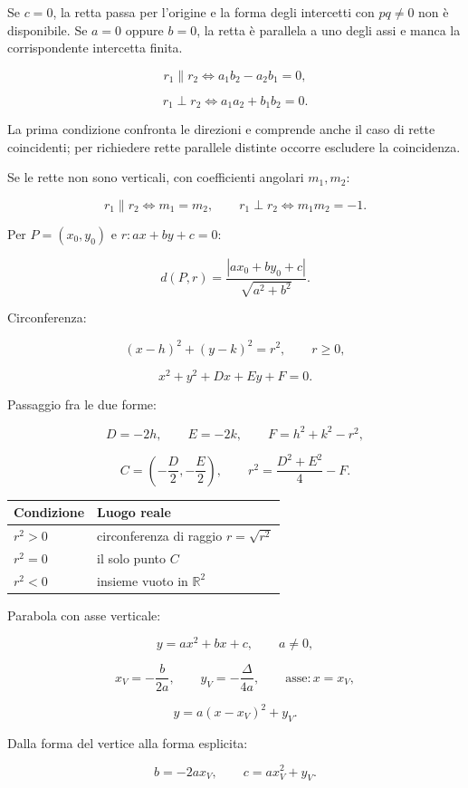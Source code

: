 Se \(c=0\), la retta passa per l'origine e la forma degli intercetti con \(pq\ne0\) non è disponibile. Se \(a=0\) oppure \(b=0\), la retta è parallela a uno degli assi e manca la corrispondente intercetta finita.

\[
r_1\parallel r_2
\Longleftrightarrow
a_1b_2-a_2b_1=0,
\]

\[
r_1\perp r_2
\Longleftrightarrow
a_1a_2+b_1b_2=0.
\]

La prima condizione confronta le direzioni e comprende anche il caso di rette coincidenti; per richiedere rette parallele distinte occorre escludere la coincidenza.

Se le rette non sono verticali, con coefficienti angolari \(m_1,m_2\):

\[
r_1\parallel r_2\Longleftrightarrow m_1=m_2,
\qquad
r_1\perp r_2\Longleftrightarrow m_1m_2=-1.
\]

Per \(P=(x_0,y_0)\) e \(r:ax+by+c=0\):

\[
d(P,r)=\frac{|ax_0+by_0+c|}{\sqrt{a^2+b^2}}.
\]

Circonferenza:

\[
(x-h)^2+(y-k)^2=r^2,
\qquad r\ge0,
\]

\[
x^2+y^2+Dx+Ey+F=0.
\]

Passaggio fra le due forme:

\[
D=-2h,
\qquad
E=-2k,
\qquad
F=h^2+k^2-r^2,
\]

\[
C=\left(-\frac D2,-\frac E2\right),
\qquad
r^2=\frac{D^2+E^2}{4}-F.
\]

\begin{longtable}[]{@{}ll@{}}
\toprule\noalign{}
Condizione & Luogo reale \\
\midrule\noalign{}
\endhead
\bottomrule\noalign{}
\endlastfoot
\(r^2>0\) & circonferenza di raggio \(r=\sqrt{r^2}\) \\
\(r^2=0\) & il solo punto \(C\) \\
\(r^2<0\) & insieme vuoto in \(\mathbb R^2\) \\
\end{longtable}

Parabola con asse verticale:

\[
y=ax^2+bx+c,
\qquad a\ne0,
\]

\[
x_V=-\frac b{2a},
\qquad
y_V=-\frac\Delta{4a},
\qquad
\text{asse}:x=x_V,
\]

\[
y=a(x-x_V)^2+y_V.
\]

Dalla forma del vertice alla forma esplicita:

\[
b=-2ax_V,
\qquad
c=ax_V^2+y_V.
\]

